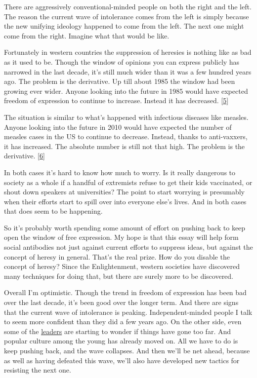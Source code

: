 There are aggressively conventional-minded people on both the right and
the left. The reason the current wave of intolerance comes from the left
is simply because the new unifying ideology happened to come from the
left. The next one might come from the right. Imagine what that would be
like.

Fortunately in western countries the suppression of heresies is nothing
like as bad as it used to be. Though the window of opinions you can
express publicly has narrowed in the last decade, it's still much wider
than it was a few hundred years ago. The problem is the derivative. Up
till about 1985 the window had been growing ever wider. Anyone looking
into the future in 1985 would have expected freedom of expression to
continue to increase. Instead it has decreased. {[}\hyperref[f5n]{5}{]}

The situation is similar to what's happened with infectious diseases
like measles. Anyone looking into the future in 2010 would have expected
the number of measles cases in the US to continue to decrease. Instead,
thanks to anti-vaxxers, it has increased. The absolute number is still
not that high. The problem is the derivative. {[}\hyperref[f6n]{6}{]}

In both cases it's hard to know how much to worry. Is it really
dangerous to society as a whole if a handful of extremists refuse to get
their kids vaccinated, or shout down speakers at universities? The point
to start worrying is presumably when their efforts start to spill over
into everyone else's lives. And in both cases that does seem to be
happening.

So it's probably worth spending some amount of effort on pushing back to
keep open the window of free expression. My hope is that this essay will
help form social antibodies not just against current efforts to suppress
ideas, but against the concept of heresy in general. That's the real
prize. How do you disable the concept of heresy? Since the
Enlightenment, western societies have discovered many techniques for
doing that, but there are surely more to be discovered.

Overall I'm optimistic. Though the trend in freedom of expression has
been bad over the last decade, it's been good over the longer term. And
there are signs that the current wave of intolerance is peaking.
Independent-minded people I talk to seem more confident than they did a
few years ago. On the other side, even some of the
\href{https://www.nytimes.com/2022/03/18/opinion/cancel-culture-free-speech-poll.html}{leaders}
are starting to wonder if things have gone too far. And popular culture
among the young has already moved on. All we have to do is keep pushing
back, and the wave collapses. And then we'll be net ahead, because as
well as having defeated this wave, we'll also have developed new tactics
for resisting the next one.

